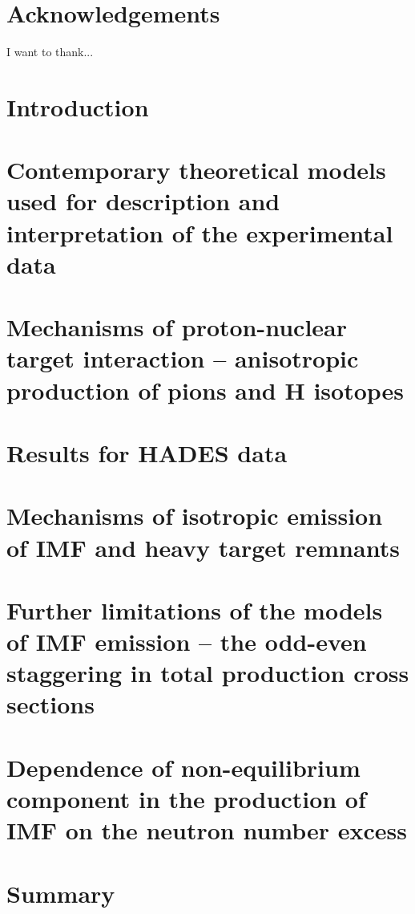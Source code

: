 \documentclass[12pt]{report}
\begin{document}
\chapter*{Acknowledgements}
I want to thank...
 

\chapter{Introduction}

 
\chapter{Contemporary theoretical models used for description and interpretation of the experimental
data}

 \chapter{Mechanisms of proton-nuclear target interaction – anisotropic production of pions and H
isotopes}

\chapter{Results for HADES data}

\chapter{Mechanisms of isotropic emission of IMF and heavy target remnants}

 \chapter{Further limitations of the models of IMF emission – the odd-even staggering in total production cross sections}
 
 \chapter{Dependence of non-equilibrium component in the production of IMF on the neutron number
excess}
 
\chapter{Summary}

\printbibliography
\end{document}
